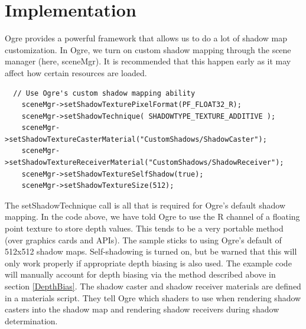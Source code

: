 \documentclass[]{article}  %
\begin{document}
\section{Implementation}
\label{Implementation}

Ogre provides a powerful framework that allows us to do a lot of shadow map customization.  
In Ogre, we turn on custom shadow mapping through the scene manager (here, sceneMgr).  It is recommended that this happen early as it may affect how certain resources are loaded.  

\begin{verbatim}
  // Use Ogre's custom shadow mapping ability
	sceneMgr->setShadowTexturePixelFormat(PF_FLOAT32_R);
	sceneMgr->setShadowTechnique( SHADOWTYPE_TEXTURE_ADDITIVE );
	sceneMgr->setShadowTextureCasterMaterial("CustomShadows/ShadowCaster");
	sceneMgr->setShadowTextureReceiverMaterial("CustomShadows/ShadowReceiver");
	sceneMgr->setShadowTextureSelfShadow(true);	
	sceneMgr->setShadowTextureSize(512);
\end{verbatim}

The setShadowTechnique call is all that is required for Ogre's default shadow mapping.  
In the code above, we have told Ogre to use the R channel of a floating point texture to store depth values.  This tends to be a very portable method (over graphics cards and APIs).  The sample sticks to using Ogre's default of 512x512 shadow maps.  Self-shadowing is turned on, but be warned that this will only work properly if appropriate depth biasing is also used.  The example code will manually account for depth biasing via the method described above in section \ref{DepthBias}.  The shadow caster and shadow receiver materials are defined in a materials script.  They tell Ogre which shaders to use when rendering shadow casters into the shadow map and rendering shadow receivers during shadow determination.  
\end{document}
